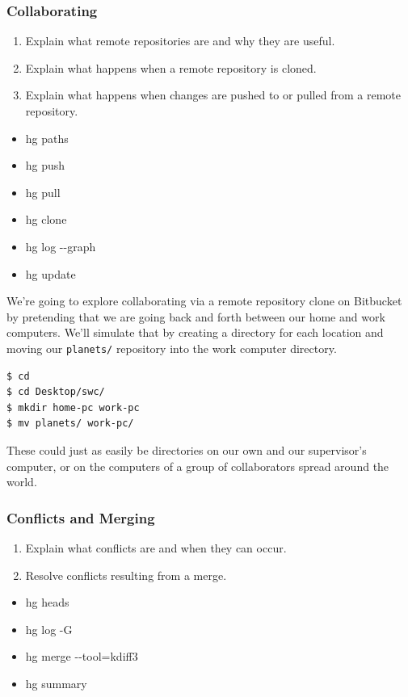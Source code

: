 \documentclass[xcolor=dvipsnames]{beamer}
\renewcommand{\dh}{{-}{-}}
\begin{document}
\begin{frame}[label=Collaborating]
\frametitle{Collaborating}
\begin{enumerate}
  \item Explain what remote repositories are and why they are useful.
  \item Explain what happens when a remote repository is cloned.
  \item Explain what happens when changes are pushed to or pulled from a remote repository.
\end{enumerate}
\begin{multicols}{2}
\begin{itemize}
  \item hg paths
  \item hg push
  \item hg pull
  \item hg clone
  \item hg log \dh graph
  \item hg update
\end{itemize}
\end{multicols}
\end{frame}


\begin{frame}[fragile]
We're going to explore collaborating via a remote repository clone on Bitbucket by pretending that we are going back and forth between our home and work computers.
We'll simulate that by creating a directory for each location and moving our {\tt planets/} repository into the work computer directory.
\begin{verbatim}
$ cd
$ cd Desktop/swc/
$ mkdir home-pc work-pc
$ mv planets/ work-pc/
\end{verbatim}
These could just as easily be directories on our own and our supervisor's computer,
or on the computers of a group of collaborators spread around the world.
\end{frame}




\begin{frame}
\frametitle{Conflicts and Merging}
\begin{enumerate}
  \item Explain what conflicts are and when they can occur.
  \item Resolve conflicts resulting from a merge.
\end{enumerate}
\begin{multicols}{2}
\begin{itemize}
  \item hg heads
  \item hg log -G
  \item hg merge \dh tool=kdiff3
  \item hg summary
\end{itemize}
\end{multicols}
\end{frame}
\end{document}
